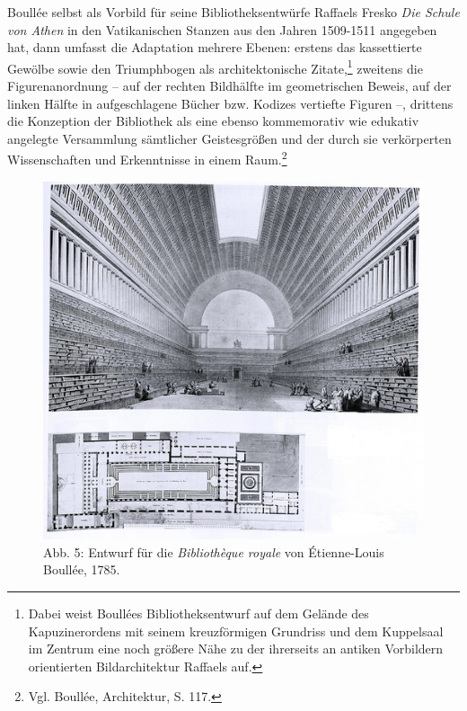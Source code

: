 Boullée selbst als Vorbild für seine Bibliotheksentwürfe Raffaels Fresko
\emph{Die Schule von Athen} in den Vatikanischen Stanzen aus den Jahren
1509-1511 angegeben hat, dann umfasst die Adaptation mehrere Ebenen:
erstens das kassettierte Gewölbe sowie den Triumphbogen als
architektonische Zitate,\footnote{Dabei weist Boullées
  Bibliotheksentwurf auf dem Gelände des Kapuzinerordens mit seinem
  kreuzförmigen Grundriss und dem Kuppelsaal im Zentrum eine noch
  größere Nähe zu der ihrerseits an antiken Vorbildern orientierten
  Bildarchitektur Raffaels auf.} zweitens die Figurenanordnung -- auf
der rechten Bildhälfte im geometrischen Beweis, auf der linken Hälfte in
aufgeschlagene Bücher bzw. Kodizes vertiefte Figuren --, drittens die
Konzeption der Bibliothek als eine ebenso kommemorativ wie edukativ
angelegte Versammlung sämtlicher Geistesgrößen und der durch sie
verkörperten Wissenschaften und Erkenntnisse in einem Raum.\footnote{Vgl.
  Boullée, Architektur, S. 117.}

\begin{figure}[htbp]
\centering
\includegraphics{img/wagner-5.jpg}
\caption*{Abb. 5: Entwurf für die \emph{Bibliothèque royale} von
Étienne-Louis Boullée, 1785.}
\end{figure}

